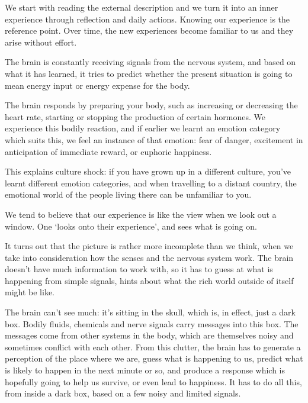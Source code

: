 We start with reading the external description and we turn it into an
inner experience through reflection and daily actions. Knowing our
experience is the reference point. Over time, the new experiences become
familiar to us and they arise without effort.


The brain is constantly receiving signals from the nervous system, and
based on what it has learned, it tries to predict whether the present
situation is going to mean energy input or energy expense for the body.

The brain responds by preparing your body, such as increasing or
decreasing the heart rate, starting or stopping the production of
certain hormones. We experience this bodily reaction, and if earlier we
learnt an emotion category which suits this, we feel an instance of that
emotion: fear of danger, excitement in anticipation of immediate reward,
or euphoric happiness.

This explains culture shock: if you have grown up in a different
culture, you've learnt different emotion categories, and when travelling
to a distant country, the emotional world of the people living there can
be unfamiliar to you.

We tend to believe that our experience is like the view when we look out
a window. One `looks onto their experience', and sees what is going on.

It turns out that the picture is rather more incomplete than we think,
when we take into consideration how the senses and the nervous system
work. The brain doesn't have much information to work with, so it has to
guess at what is happening from simple signals, hints about what the
rich world outside of itself might be like.

The brain can't see much: it's sitting in the skull, which is, in
effect, just a dark box. Bodily fluids, chemicals and nerve signals
carry messages into this box. The messages come from other systems in
the body, which are themselves noisy and sometimes conflict with each
other. From this clutter, the brain has to generate a perception of the
place where we are, guess what is happening to us, predict what is
likely to happen in the next minute or so, and produce a response which
is hopefully going to help us survive, or even lead to happiness. It has
to do all this, from inside a dark box, based on a few noisy and limited
signals.

\clearpage

